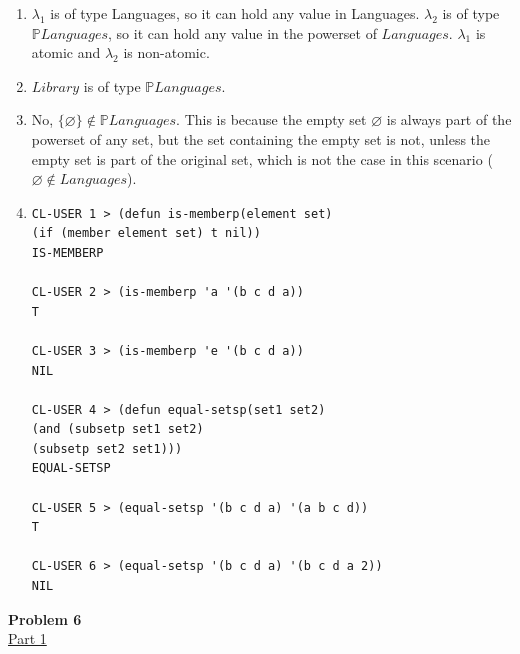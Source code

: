 \documentclass[12pt]{article}
\begin{document}
\begin{enumerate}
\item $\lambda_{1}$ is of type Languages, so it can hold any value in Languages. $\lambda_{2}$ is of type $\mathbb{P}Languages$, so it can hold any value in the powerset of $Languages$. $\lambda_{1}$ is atomic and $\lambda_{2}$ is non-atomic.
\item $Library$ is of type $\mathbb{P}Languages$.
\item No, $\{\varnothing \} \notin 
\mathbb{P}Languages$. This is because the empty set $\varnothing$ is always part of the powerset of any set, but the set containing the empty set is not, unless the empty set is part of the original set, which is not the case in this scenario ($\varnothing \notin Languages$).
\item
\begin{verbatim}
CL-USER 1 > (defun is-memberp(element set)
(if (member element set) t nil))
IS-MEMBERP

CL-USER 2 > (is-memberp 'a '(b c d a))
T

CL-USER 3 > (is-memberp 'e '(b c d a))
NIL

CL-USER 4 > (defun equal-setsp(set1 set2)
(and (subsetp set1 set2)
(subsetp set2 set1)))
EQUAL-SETSP

CL-USER 5 > (equal-setsp '(b c d a) '(a b c d))
T

CL-USER 6 > (equal-setsp '(b c d a) '(b c d a 2))
NIL
\end{verbatim}
\end{enumerate}
\noindent \textbf{Problem 6}\\
\noindent\underline{Part 1}\\
\end{document}

